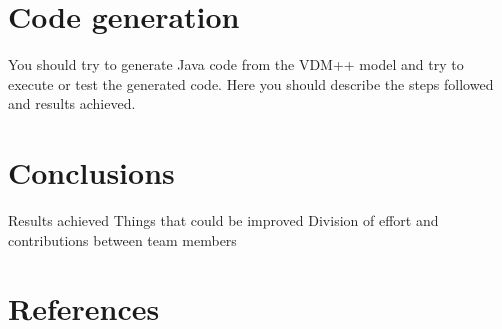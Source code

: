\documentclass[a4paper]{article}
\begin{document}
\section{Code generation}
You should try to generate Java code from the VDM++ model and try to execute or test 
the generated code. Here you should describe the steps followed and results achieved. 
\section{Conclusions}
Results achieved  
Things that could be improved 
Division of effort and contributions between team members 
\section{References}
\end{document}
